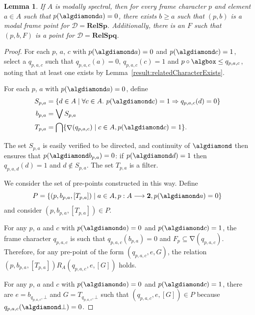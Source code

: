 \documentclass{article}[a4paper]
\newtheorem{lemma}{Lemma}%
\theoremstyle{definition}
\newcommand{\Dcal}{\mathcal{D}} %
\newcommand{\relsp}{\mathbf{RelSp}}
\newcommand{\relspq}{\mathbf{RelSpq}}
\newcommand{\twobb}{\mathbf{2}}
\DeclareMathOperator{\charop}{\nabla}
\begin{document}
\begin{lemma}
\label{result:pairprepoint2Point}
If $A$ is modally spectral, then for every frame character $p$ and element $a \in A$ such that $p(\algdiamond a)=0$, there exists $b\geq a$ such that $(p,b)$ is a modal frame point for $\Dcal = \relsp$.
Additionally, there is an $F$ such that $(p,b,F)$ is a point for $\Dcal = \relspq$.
\end{lemma}

\begin{proof}
For each $p$, $a$, $c$ with $p(\algdiamond a) = 0$ and $p(\algdiamond c)=1$, select a $q_{p, a, c}$ such that $q_{p, a, c} (a) = 0$, $q_{p, a, c}(c)=1$ and $p \circ \algbox \leq q_{p, a, c}$, noting that at least one exists by Lemma~\ref{result:relatedCharacterExists}.  

For each $p$, $a$ with $p(\algdiamond a) = 0$, define 
\begin{align*}
    S_{p,a} &= \{ d \in A \mid \forall c \in A. \ p( \algdiamond c)=1 \Rightarrow q_{p,a,c} (d)=0 \}\\ 
    b_{p,a} &= \bigvee S_{p,a} \\
    T_{p,a} &= \bigcap \{ \charop(q_{p,a,c}) \mid c\in A , p(\algdiamond c)=1 \} . 
\end{align*}

The set $S_{p,a}$ is easily verified to be directed, and continuity of $\algdiamond$ then ensures that $p(\algdiamond b_{p,a}) = 0$: if $p(\algdiamond d)=1$ then $q_{p,a,d}(d)=1$ and $d \notin S_{p,a}$. 
The set $T_{p,a}$ is a filter. 

We consider the set of pre-points constructed in this way. 
Define
\begin{equation*}
    P = \{ (p, b_{p,a}, [T_{p,a}] ) \mid a \in A, p:A \longrightarrow \twobb , p(\algdiamond a) = 0 \}
\end{equation*}
and consider $(p, b_{p,a}, [T_{p,a}] ) \in P$.

For any $p$, $a$ and $c$ with $p(\algdiamond a)=0$ and $p(\algdiamond c)=1$, the frame character $q_{p,a,c}$ is such that $q_{p,a,c} (b_{p,a}) = 0$ and $F_p \subseteq \charop (q_{p,a,c})$. Therefore, for any pre-point of the form $(q_{p,a,c},e,G)$, the relation $(p, b_{p,a}, [T_{p,a}] ) R_A (q_{p,a,c},e,[G])$ holds.

For any $p$, $a$ and $c$ with $p(\algdiamond a)=0$ and $p(\algdiamond c)=1$, there are $e=b_{q_{p,a,c},\bot}$ and $G=T_{q_{p,a,c},\bot}$ such that $(q_{p,a,c}, e,[G]) \in P$  because $q_{p,a,c} (\algdiamond \bot) = 0$. 


\end{proof}
\end{document}
